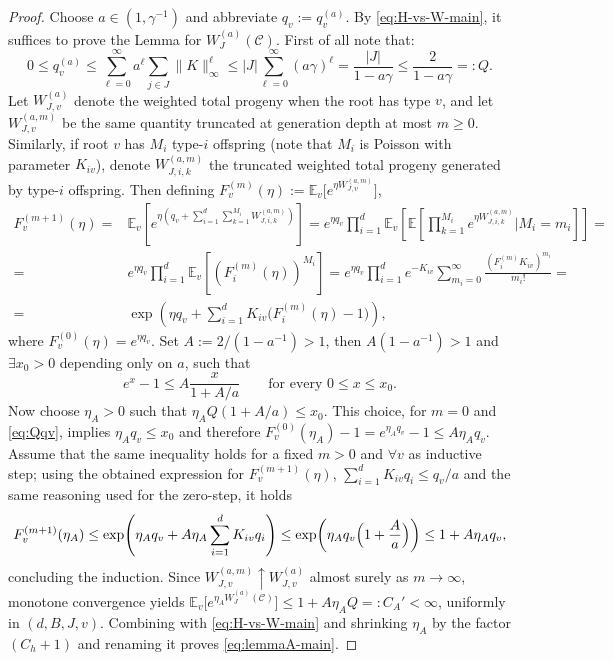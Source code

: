 \documentclass{article}
\begin{document}
\begin{proof}
Choose $a\in(1,\gamma^{-1})$ and abbreviate $q_v:=q_v^{(a)}$. By \eqref{eq:H-vs-W-main}, it suffices to prove the Lemma for $W_J^{(a)}(\mathcal C)$. First of all note that: 
\begin{equation}
    \label{eq:Qqv}
    0\le q_v^{(a)}\le \sum_{\ell=0}^{\infty} a^{\ell}\sum_{j\in J}\|K\|_{\infty}^\ell\le |J|\sum_{\ell=0}^{\infty} (a\gamma)^{\ell}= \frac{|J|}{1-a\gamma}\le \frac{2}{1-a\gamma}=:Q.
\end{equation}
Let $W_{J,v}^{(a)}$ denote the weighted total progeny when the root has type $v$, and let $W_{J,v}^{(a,m)}$ be the same quantity truncated at generation depth at most $m\ge 0$. Similarly, if root $v$ has $M_i$ type-$i$ offspring (note that $M_i$ is Poisson with parameter $K_{iv}$), denote $W_{J,i,k}^{(a,m)}$ the truncated weighted total progeny generated by type-$i$ offspring. Then defining $F_v^{(m)}(\eta):=\mathbb E_v\big[e^{\eta W_{J,v}^{(a,m)}}\big]$, 
\begin{align*}
    F_v^{(m+1)}(\eta)={ }&  \mathbb E_v\left[ e^{\eta \left(q_v+\sum_{i=1}^d\sum_{k=1}^{M_i}W_{J,i,k}^{(a,m)} \right)} \right]=e^{\eta q_v}\prod_{i=1}^d\mathbb E_v\left[ \mathbb E\left[ \prod_{k=1}^{M_i}e^{\eta W_{J,i,k}^{(a,m)}}\biggl|M_i=m_i  \right] \right]=\\
    ={ }& e^{\eta q_v}\prod_{i=1}^d\mathbb E_v\left[ \left(F^{(m)}_i(\eta)\right)^{M_i}\right] =  e^{\eta q_v}\prod_{i=1}^d e^{-K_{iv}}\sum_{m_i=0}^{\infty} \frac{\left(F_i^{(m)} K_{iv}\right)^{m_i}}{m_i!}=\\
    ={ }& \exp\left(\eta q_v + \sum_{i=1}^d K_{iv}\bigl(F_i^{(m)}(\eta)-1\bigr)\right),
\end{align*}
where $F_v^{(0)}(\eta)=e^{\eta q_v}$. Set $A:=2/(1-a^{-1})>1$, then $A(1-a^{-1})>1$ and $\exists x_0>0$ depending only on $a$, such that
\begin{equation}
\label{eq:Ax-main}
e^x-1\le A\frac{x}{1+A/a}
\qquad\text{for every }0\le x\le x_0.
\end{equation}
Now choose $\eta_A>0$ such that $\eta_A Q(1+A/a)\le x_0$. This choice, for $m=0$ and \eqref{eq:Qqv}, implies $\eta_A q_v\le x_0$ and therefore $F_v^{(0)}(\eta_A)-1=e^{\eta_A q_v}-1\le A\eta_A q_v$. Assume that the same inequality holds for a fixed $m>0$ and $\forall v$ as inductive step; using the obtained expression for $F_v^{(m+1)}(\eta)$,  $\sum_{i=1}^d K_{iv}q_i\le  q_v/a$ and the same reasoning used for the zero-step, it holds
\[
F_v^{(m+1)}(\eta_A)
\le
\exp\!\left(\eta_A q_v + A\eta_A\sum_{i=1}^d K_{iv}q_i\right)
\le
\exp\!\left(\eta_A q_v\Bigl(1+\frac{A}{a}\Bigr)\right)\le 1+A\eta_Aq_v,
\]
concluding the induction. Since $W_{J,v}^{(a,m)}\uparrow W_{J,v}^{(a)}$ almost surely as $m\to\infty$, monotone convergence yields $\mathbb E_v\big[e^{\eta_A W_J^{(a)}(\mathcal C)}\big] \le 1+A\eta_A Q =:C_A'<\infty$,
uniformly in $(d,B,J,v)$. Combining with \eqref{eq:H-vs-W-main} and shrinking $\eta_A$ by the factor $(C_h+1)$ and renaming it proves \eqref{eq:lemmaA-main}.
\end{proof}
\end{document}
